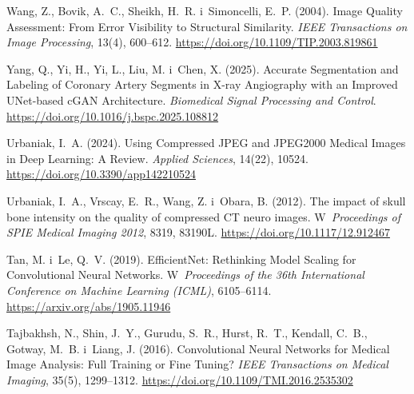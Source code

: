 \documentclass[12pt,a4paper]{article}
\begin{document}
\begin{enumerate}[label={[\arabic*]}]
    \item \hypertarget{bib9}{}Wang, Z., Bovik, A.~C., Sheikh, H.~R. i~Simoncelli, E.~P. (2004). Image Quality Assessment: From Error Visibility to Structural Similarity. \textit{IEEE Transactions on Image Processing}, 13(4), 600--612. \url{https://doi.org/10.1109/TIP.2003.819861}

    \item \hypertarget{bib10}{}Yang, Q., Yi, H., Yi, L., Liu, M. i~Chen, X. (2025). Accurate Segmentation and Labeling of Coronary Artery Segments in X-ray Angiography with an Improved UNet-based cGAN Architecture. \textit{Biomedical Signal Processing and Control}. \url{https://doi.org/10.1016/j.bspc.2025.108812}

    \item \hypertarget{bib11}{}Urbaniak, I.~A. (2024). Using Compressed JPEG and JPEG2000 Medical Images in Deep Learning: A Review. \textit{Applied Sciences}, 14(22), 10524. \url{https://doi.org/10.3390/app142210524}

    \item \hypertarget{bib12}{}Urbaniak, I.~A., Vrscay, E.~R., Wang, Z. i~Obara, B. (2012). The impact of skull bone intensity on the quality of compressed CT neuro images. W~\textit{Proceedings of SPIE Medical Imaging 2012}, 8319, 83190L. \url{https://doi.org/10.1117/12.912467}

    \item \hypertarget{bib13}{}Tan, M. i~Le, Q.~V. (2019). EfficientNet: Rethinking Model Scaling for Convolutional Neural Networks. W~\textit{Proceedings of the 36th International Conference on Machine Learning (ICML)}, 6105--6114. \url{https://arxiv.org/abs/1905.11946}

    \item \hypertarget{bib14}{}Tajbakhsh, N., Shin, J.~Y., Gurudu, S.~R., Hurst, R.~T., Kendall, C.~B., Gotway, M.~B. i~Liang, J. (2016). Convolutional Neural Networks for Medical Image Analysis: Full Training or Fine Tuning? \textit{IEEE Transactions on Medical Imaging}, 35(5), 1299--1312. \url{https://doi.org/10.1109/TMI.2016.2535302}
\end{enumerate}
\end{document}
